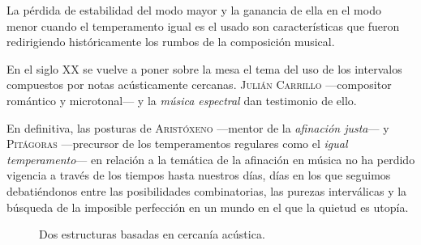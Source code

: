 \documentclass[a4paper,12pt]{article}
\begin{document}
\begin{multicols}{2}
  La pérdida de estabilidad del modo mayor y la ganancia de ella en el modo menor cuando el temperamento igual es el usado son características que fueron redirigiendo históricamente los rumbos de la composición musical.

  En el siglo XX se vuelve a poner sobre la mesa el tema del uso de los intervalos compuestos por notas acústicamente cercanas. \textsc{Julián Carrillo} ---compositor romántico y microtonal--- y la \emph{música espectral} dan testimonio de ello.

  En definitiva, las posturas de \textsc{Aristóxeno} ---mentor de la \emph{afinación justa}--- y \textsc{Pitágoras} ---precursor de los temperamentos regulares como el \emph{igual temperamento}--- en relación a la temática de la afinación en música no ha perdido vigencia a través de los tiempos hasta nuestros días, días en los que seguimos debatiéndonos entre las posibilidades combinatorias, las purezas interválicas y la búsqueda de la imposible perfección en un mundo en el que la quietud es utopía.
\end{multicols}

\begin{figure}[ht]
\centering
{}
\caption{Dos estructuras basadas en cercanía acústica.}\label{fig:dos-estructuras}
\end{figure}
\end{document}
